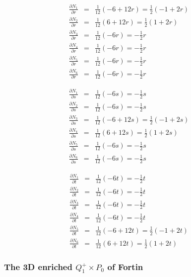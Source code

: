 \begin{eqnarray}
\frac{\partial N_1}{\partial r} &=& \frac{1}{12}(-6+12r) = \frac{1}{2}(-1+2r)\\
\frac{\partial N_2}{\partial r} &=& \frac{1}{12}(6+12r) = \frac{1}{2}(1+2r)\\
\frac{\partial N_3}{\partial r} &=& \frac{1}{12}(-6r) = -\frac{1}{2}r \\
\frac{\partial N_4}{\partial r} &=& \frac{1}{12}(-6r) = -\frac{1}{2}r \\
\frac{\partial N_5}{\partial r} &=& \frac{1}{12}(-6r) = -\frac{1}{2}r \\
\frac{\partial N_6}{\partial r} &=& \frac{1}{12}(-6r) = -\frac{1}{2}r 
\end{eqnarray}

\begin{eqnarray}
\frac{\partial N_1}{\partial s} &=& \frac{1}{12} (-6s) = -\frac{1}{2}s \\
\frac{\partial N_2}{\partial s} &=& \frac{1}{12} (-6s) = -\frac{1}{2}s \\
\frac{\partial N_3}{\partial s} &=& \frac{1}{12} (-6+12s) = \frac{1}{2} (-1+2s) \\ 
\frac{\partial N_4}{\partial s} &=& \frac{1}{12} (6+12s) = \frac{1}{2} (1+2s) \\ 
\frac{\partial N_5}{\partial s} &=& \frac{1}{12} (-6s) = -\frac{1}{2}s \\
\frac{\partial N_6}{\partial s} &=& \frac{1}{12} (-6s) = -\frac{1}{2}s 
\end{eqnarray}

\begin{eqnarray}
\frac{\partial N_1}{\partial t} &=& \frac{1}{12} (-6t) = -\frac{1}{2}t \\
\frac{\partial N_2}{\partial t} &=& \frac{1}{12} (-6t) = -\frac{1}{2}t \\
\frac{\partial N_3}{\partial t} &=& \frac{1}{12} (-6t) = -\frac{1}{2}t \\
\frac{\partial N_4}{\partial t} &=& \frac{1}{12} (-6t) = -\frac{1}{2}t \\
\frac{\partial N_5}{\partial t} &=& \frac{1}{12} (-6+12t) = \frac{1}{2} (-1+2t) \\ 
\frac{\partial N_6}{\partial t} &=& \frac{1}{12} (6+12t) = \frac{1}{2} (1+2t) 
\end{eqnarray}






\subsubsection{The 3D enriched $Q_1^+\times P_0$ of Fortin} \label{ss:Q1pP0}

